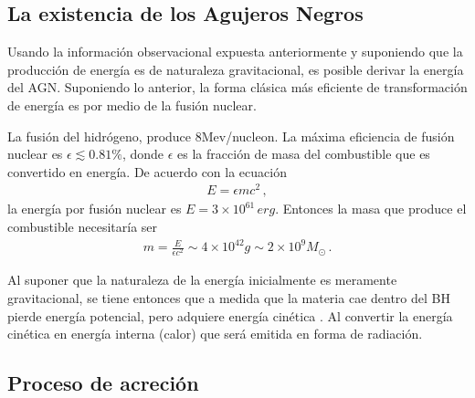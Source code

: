 	\subsection{La existencia de los Agujeros Negros}
	\label{subsec:Why_a_BH}

Usando la información observacional expuesta anteriormente y suponiendo que la producción de energía es de naturaleza gravitacional, es posible derivar la energía del AGN. Suponiendo lo anterior, la forma clásica más eficiente de transformación de energía es por medio de la fusión nuclear. 

La fusión del hidrógeno, produce 8Mev/nucleon. La máxima eficiencia de fusión nuclear es $\epsilon \lesssim 0.81 \%$, donde $\epsilon$ es la fracción de masa del combustible que es convertido en energía. De acuerdo con la ecuación 
\begin{align}
E=\epsilon mc^{2}\,,
\end{align}
%
la energía por fusión nuclear es $E=3\times10^{61}\, erg$. Entonces la masa que produce el combustible necesitaría ser 
\begin{align}
m=\frac{E}{\epsilon c^{2}} \sim 4\times10^{42}g\sim 2\times10^{9}M_{\odot}\,.
\end{align}

Al suponer que la naturaleza de la energía inicialmente es meramente gravitacional, se tiene entonces que a medida que la materia cae dentro del BH pierde energía potencial, pero adquiere energía cinética . Al convertir la energía cinética en energía interna (calor) que será emitida en forma de radiación.


	\subsection{Proceso de acreción}
	\label{subsec:Acretion}

